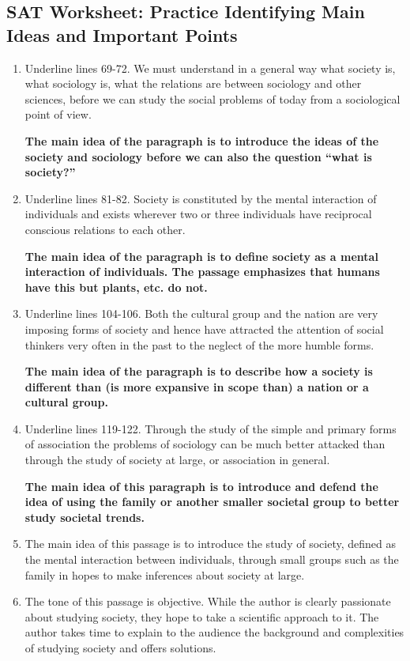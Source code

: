 \begin{enumerate}
\subsection{SAT Worksheet: Practice Identifying Main Ideas and Important Points}
\begin{enumerate}
\item Underline lines 69-72. We must understand in
a general way what society is, what sociology is, what the relations are between sociology and other sciences, before we can study the social problems of today from a sociological point of view. 

\bigskip
\textbf{The main idea of the paragraph is to introduce the ideas of the society and sociology before we can also the question ``what is society?''}
\item Underline lines 81-82. Society is constituted by the mental interaction of individuals and exists wherever two or three individuals have reciprocal conscious relations to each other. 

\bigskip
\textbf{The main idea of the paragraph is to define society as a mental interaction of individuals. The passage emphasizes that humans have this but plants, etc. do not.}
\item Underline lines 104-106. Both the cultural group and the nation are very imposing forms of society and hence have attracted the attention of social thinkers very often in the past to the neglect of the more humble forms. 

\bigskip
\textbf{The main idea of the paragraph is to describe how a society is different than (is more expansive in scope than) a nation or a cultural group.}
\item Underline lines 119-122. Through the study of the simple and primary forms of association the problems of sociology can be much better attacked than through the study of society at large, or association in general. 

\bigskip
\textbf{The main idea of this paragraph is to introduce and defend the idea of using the family or another smaller societal group to better study societal trends.}

\item The main idea of this passage is to introduce the study of society, defined as the mental interaction between individuals, through small groups such as the family in hopes to make inferences about society at large. 
\item The tone of this passage is objective. While the author is clearly passionate about studying society, they hope to take a scientific approach to it. The author takes time to explain to the audience the background and complexities of studying society and offers solutions. 
\end{enumerate}

\end{enumerate}
